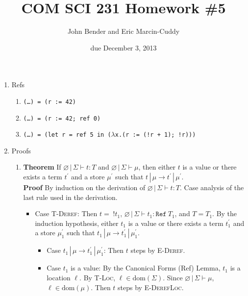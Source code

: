 \documentclass[12pt,letterpaper]{article}
\title{COM SCI 231 Homework \#5}
\author{John Bender and Eric Marcin-Cuddy}
\date{due December 3, 2013}
\begin{document}
\maketitle

\begin{enumerate}

  \item Refs
    \begin{enumerate}
      \item \texttt{(\ldots ) = (r := 42)}

      \item \texttt{(\ldots ) = (r := 42; ref 0)}

      \item \texttt{(\ldots ) = (let r = ref 5 in ($\lambda$x.(r := (!r + 1); !r)))}
    \end{enumerate}

 \item Proofs
   \begin{enumerate}

  \item \textbf{Theorem} \quad If $\varnothing \,|\, \Sigma \vdash t : T$ and $\varnothing \,|\, \Sigma \vdash \mu$, then either $t$ is a value or there exists a term $t^\prime$ and a store $\mu^\prime$ such that $t \,|\, \mu \to t^\prime \,|\, \mu^\prime$.\\
    \textbf{Proof} \quad By induction on the derivation of $\varnothing \,|\, \Sigma \vdash t : T$. Case analysis of the last rule used in the derivation.
      \begin{itemize}
      \item Case \textsc{T-Deref}: Then $t = \;!t_1$, $\varnothing \,|\, \Sigma \vdash t_1 : \mathtt{Ref}\ T_1$, and $T=T_1$. By the induction hypothesis, either $t_1$ is a value or there exists a term $t_1^\prime$ and a store $\mu_1^\prime$ such that $t_1 \,|\, \mu \to t_1^\prime \,|\, \mu_1^\prime$.
        \begin{itemize}
        \item Case $t_1 \,|\, \mu \to t_1^\prime \,|\, \mu_1^\prime$: Then $t$ steps by \textsc{E-Deref}.
        \item Case $t_1$ is a value: By the Canonical Forms (Ref) Lemma, $t_1$ is a location $\ell$. By \textsc{T-Loc}, $\ell \in \text{dom}(\Sigma)$. Since $\varnothing \,|\, \Sigma \vdash \mu$, $\ell \in \text{dom}(\mu)$. Then $t$ steps by \textsc{E-DerefLoc}.
        \end{itemize}
      \end{itemize}


\end{enumerate}
\end{enumerate}
\end{document}
